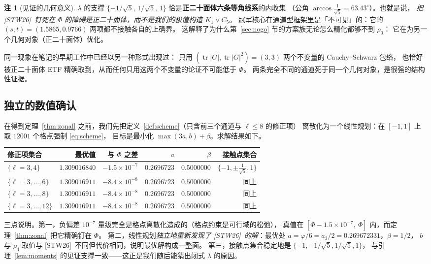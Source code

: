 \documentclass[UTF8,11pt]{ctexart}
\theoremstyle{definition}
\newtheorem{remark}[theorem]{注}
\newcommand{\tr}{\operatorname{tr}}
\newcommand{\STW}{\textup{[STW26]}}
\begin{document}
\begin{remark}[见证的几何意义]\label{rmk:geo}
$\lambda$ 的支撑 $\{-1/\sqrt5,\,1/\sqrt5,\,1\}$ 恰是\textbf{正二十面体六条等角线系}的内收集
（公角 $\arccos\frac1{\sqrt5}=63.43^\circ$）。也就是说，
\emph{把 \STW\ 钉死在 $\Phi$ 的障碍是正二十面体，而不是我们的极值构造 $K_1\vee C_5$}。
冠军核心在通道型框架里是「不可见」的：它的 $(s,t)=(1.5865,0.9766)$ 两项都不接触各自的上确界。
这解释了为什么第~\ref{sec:nogo} 节的方案族无论怎么精化都够不到 $\rho_0$：
它在为另一个几何对象（正二十面体）优化。

同一现象在笔记的早期工作中已经以另一种形式出现过：
只用 $(\tr|G|,\tr|G|^2)=(3,3)$ 两个不变量的 Cauchy--Schwarz 包络，
也恰好被正二十面体 ETF 精确取到，从而任何只用这两个不变量的论证不可能低于 $\Phi$。
两条完全不同的通道死于同一个几何对象，是很强的结构性证据。
\end{remark}

\subsection{独立的数值确认}

在得到定理~\ref{thm:zonal} 之前，我们先把定义~\ref{def:scheme}（只含前三个通道与 $\ell\le8$ 的修正项）
离散化为一个线性规划：在 $[-1,1]$ 上取 $12001$ 个格点强制 \eqref{eq:scheme}，
目标是最小化 $\max(3a,b)+\beta$。求解结果如下。

\begin{center}
{\small
\begin{tabular}{@{}lrrrrr@{}}
\toprule
修正项集合 & 最优值 & 与 $\Phi$ 之差 & $a$ & $\beta$ & 接触点集合 \\
\midrule
$\{\ell=3,4\}$ & $1.309016840$ & $-1.5\times10^{-7}$ & $0.2696723$ & $0.5000000$ & $\{-1,\pm\frac1{\sqrt5},1\}$ \\
$\{\ell=3,\dots,6\}$ & $1.309016911$ & $-8.4\times10^{-8}$ & $0.2696723$ & $0.5000000$ & 同上 \\
$\{\ell=3,\dots,8\}$ & $1.309016911$ & $-8.4\times10^{-8}$ & $0.2696723$ & $0.5000000$ & 同上 \\
$\{\ell=3,\dots,12\}$ & $1.309016911$ & $-8.4\times10^{-8}$ & $0.2696723$ & $0.5000000$ & 同上 \\
\bottomrule
\end{tabular}}
\end{center}

三点说明。第一，负偏差 $10^{-7}$ 量级完全是格点离散化造成的（格点约束是可行域的松弛），
真值在 $[\Phi-1.5\times10^{-7},\ \Phi]$ 内，而定理~\ref{thm:zonal} 把它精确钉在 $\Phi$。
第二，线性规划\emph{独立地重新发现了 \STW\ 的解}：最优处 $a=\varphi/6=a_3/2=0.269672331$，$\beta=1/2$，
$b$ 与 $\rho_4$ 取值与 \STW\ 不同但代价相同，说明最优解构成一整面。
第三，接触点集合稳定地是 $\{-1,-1/\sqrt5,1/\sqrt5,1\}$，
与引理~\ref{lem:moments} 的见证支撑一致——这正是我们随后能猜出闭式 $\lambda$ 的原因。
\end{document}
